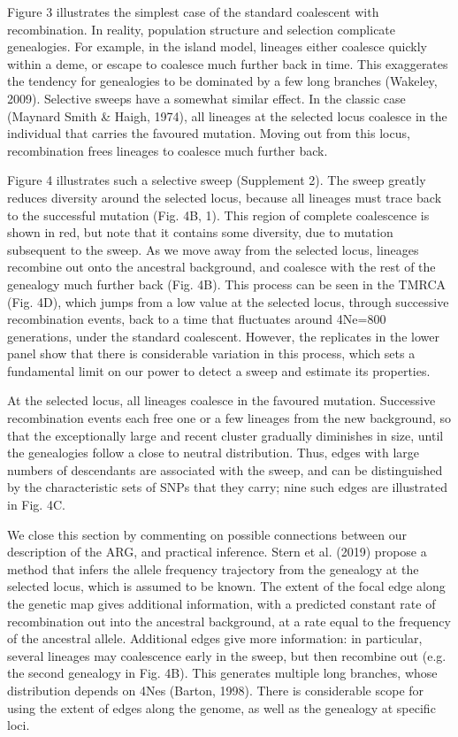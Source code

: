 \documentclass[twocolumn]{bmcart}%
\begin{document}
Figure 3 illustrates the simplest case of the standard coalescent with recombination. In reality, population structure and selection complicate genealogies. For example, in the island model, lineages either coalesce quickly within a deme, or escape to coalesce much further back in time. This exaggerates the tendency for genealogies to be dominated by a few long branches (Wakeley, 2009). Selective sweeps have a somewhat similar effect. In the classic case (Maynard Smith \& Haigh, 1974), all lineages at the selected locus coalesce in the individual that carries the favoured mutation. Moving out from this locus, recombination frees lineages to coalesce much further back.

Figure 4 illustrates such a selective sweep (Supplement 2). The sweep greatly reduces diversity around the selected locus, because all lineages must trace back to the successful mutation (Fig. 4B, 1). This region of complete coalescence is shown in red, but note that it contains some diversity, due to mutation subsequent to the sweep. As we move away from the selected locus, lineages recombine out onto the ancestral background, and coalesce with the rest of the genealogy much further back (Fig. 4B).  This process can be seen in the TMRCA (Fig. 4D), which jumps from a low value at the selected locus, through successive recombination events, back to a time that fluctuates around 4Ne=800 generations, under the standard coalescent. However, the replicates in the lower panel show that there is considerable variation in this process, which sets a fundamental limit on our power to detect a sweep and estimate its properties.

At the selected locus, all lineages coalesce in the favoured mutation. Successive recombination events each free one or a few lineages from the new background, so that the exceptionally large and recent cluster gradually diminishes in size, until the genealogies follow a close to neutral distribution. Thus, edges with large numbers of descendants are associated with the sweep, and can be distinguished by the characteristic sets of SNPs that they carry; nine such edges are illustrated in Fig. 4C. 

We close this section by commenting on possible connections between our description of the ARG, and practical inference. Stern et al. (2019) propose a method that infers the allele frequency trajectory from the genealogy at the selected locus, which is assumed to be known.  The extent of the focal edge along the genetic map gives additional information, with a predicted constant rate of recombination out into the ancestral background, at a rate equal to the frequency of the ancestral allele.  Additional edges give more information: in particular, several lineages may coalescence early in the sweep, but then recombine out (e.g. the second genealogy in Fig. 4B). This generates multiple long branches, whose distribution depends on 4Nes (Barton, 1998).  There is considerable scope for using the extent of edges along the genome, as well as the genealogy at specific loci.
\end{document}

